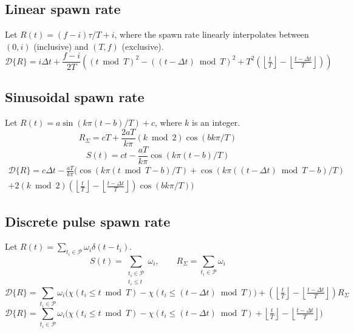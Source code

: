 \documentclass[10pt]{report}
\newcommand{\floor}[1]{\left\lfloor #1 \right\rfloor}
\begin{document}
\subsection{Linear spawn rate}
Let $R(t)=(f-i)\tau/T+i$, where the spawn rate linearly interpolates between $(0,i)$ (inclusive) and $(T,f)$ (exclusive).
\begin{equation}\mathcal{D}\{R\}=i\Delta t+\frac{f-i}{2T}\left((t\bmod T)^2-((t-\Delta t)\bmod T)^2+T^2(\floor{\tfrac{t}{T}}-\floor{\tfrac{t-\Delta t}{T}})\right)\end{equation}

\subsection{Sinusoidal spawn rate}
Let $R(t)=a\sin(k\pi(t-b)/T)+c$, where $k$ is an integer.
\begin{equation}R_\Sigma=cT+\frac{2aT}{k\pi}(k\bmod 2)\cos(bk\pi/T)\end{equation}
\begin{equation}S(t)=ct-\frac{aT}{k\pi}\cos(k\pi(t-b)/T)\end{equation}
\begin{multline}\mathcal{D}\{R\}=c\Delta t-\frac{aT}{k\pi}\Big(\cos(k\pi(t\bmod T-b)/T)+\cos(k\pi((t-\Delta t)\bmod T-b)/T)\\+2(k\bmod 2)(\floor{\tfrac{t}{T}}-\floor{\tfrac{t-\Delta t}{T}})\cos(bk\pi/T)\Big)\end{multline}

\subsection{Discrete pulse spawn rate}
Let $R(t)=\sum_{t_i\in\mathcal{P}}\omega_i\delta(t-t_i)$.
\begin{equation}S(t)=\sum_{\substack{t_i\in\mathcal{P}\\t_i\leq t}}\omega_i,\qquad R_\Sigma=\sum_{t_i\in\mathcal{P}}\omega_i\end{equation}
\begin{equation}\mathcal{D}\{R\}=\sum_{t_i\in\mathcal{P}}\omega_i\Big(\chi(t_i\leq t\bmod T)-\chi(t_i\leq(t-\Delta t)\bmod T)\Big)+(\floor{\tfrac{t}{T}}-\floor{\tfrac{t-\Delta t}{T}})R_\Sigma\end{equation}
\begin{equation}\mathcal{D}\{R\}=\sum_{t_i\in\mathcal{P}}\omega_i\Big(\chi(t_i\leq t\bmod T)-\chi(t_i\leq(t-\Delta t)\bmod T)+\floor{\tfrac{t}{T}}-\floor{\tfrac{t-\Delta t}{T}}\Big)\end{equation}
\end{document}
